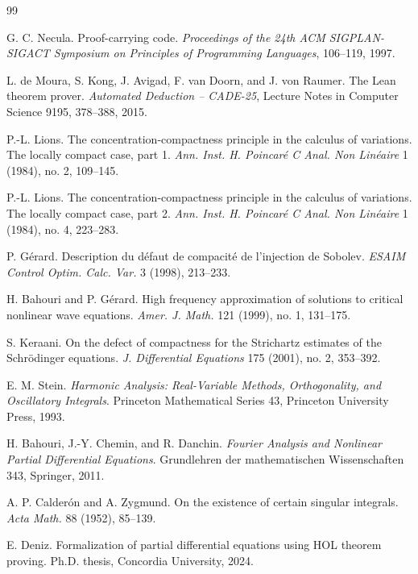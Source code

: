 \documentclass[11pt]{article}
\theoremstyle{plain}
\theoremstyle{definition}
\theoremstyle{remark}
\begin{document}
\begin{thebibliography}{99}

G. C. Necula.
Proof-carrying code.
\emph{Proceedings of the 24th ACM SIGPLAN-SIGACT Symposium on Principles of Programming Languages}, 106--119, 1997.

L. de Moura, S. Kong, J. Avigad, F. van Doorn, and J. von Raumer.
The Lean theorem prover.
\emph{Automated Deduction -- CADE-25}, Lecture Notes in Computer Science 9195, 378--388, 2015.

P.-L. Lions.
The concentration-compactness principle in the calculus of variations. The locally compact case, part 1.
\emph{Ann. Inst. H. Poincar\'e C Anal. Non Lin\'eaire} 1 (1984), no. 2, 109--145.

P.-L. Lions.
The concentration-compactness principle in the calculus of variations. The locally compact case, part 2.
\emph{Ann. Inst. H. Poincar\'e C Anal. Non Lin\'eaire} 1 (1984), no. 4, 223--283.

P. G\'erard.
Description du d\'efaut de compacit\'e de l'injection de Sobolev.
\emph{ESAIM Control Optim. Calc. Var.} 3 (1998), 213--233.

H. Bahouri and P. G\'erard.
High frequency approximation of solutions to critical nonlinear wave equations.
\emph{Amer. J. Math.} 121 (1999), no. 1, 131--175.

S. Keraani.
On the defect of compactness for the Strichartz estimates of the Schr\"odinger equations.
\emph{J. Differential Equations} 175 (2001), no. 2, 353--392.

E. M. Stein.
\emph{Harmonic Analysis: Real-Variable Methods, Orthogonality, and Oscillatory Integrals}.
Princeton Mathematical Series 43, Princeton University Press, 1993.

H. Bahouri, J.-Y. Chemin, and R. Danchin.
\emph{Fourier Analysis and Nonlinear Partial Differential Equations}.
Grundlehren der mathematischen Wissenschaften 343, Springer, 2011.

A. P. Calder\'on and A. Zygmund.
On the existence of certain singular integrals.
\emph{Acta Math.} 88 (1952), 85--139.

E. Deniz.
Formalization of partial differential equations using HOL theorem proving.
Ph.D. thesis, Concordia University, 2024.


\end{thebibliography}
\end{document}
